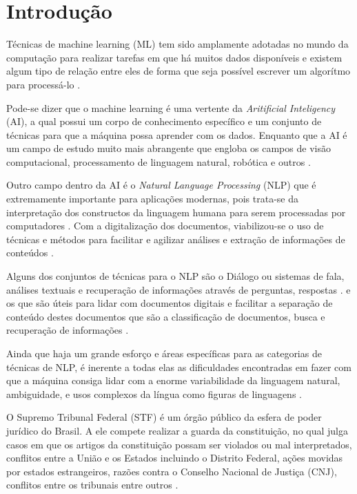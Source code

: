\chapter[Introdução]{Introdução}

Técnicas de machine learning (ML) tem sido amplamente adotadas no mundo da computação para realizar tarefas em que há muitos dados disponíveis e existem algum tipo de relação entre eles de forma que seja possível escrever um algorítmo para processá-lo \cite{BRINK2015}.

Pode-se dizer que o machine learning é uma vertente da \textit{Aritificial Inteligency} (AI), a qual possui um corpo de conhecimento específico e um conjunto de técnicas para que a máquina possa aprender com os dados. Enquanto que a AI é um campo de estudo muito mais abrangente que engloba os campos de visão computacional, processamento de linguagem natural, robótica e outros \cite{BRINK2015}. 

Outro campo dentro da AI é o \textit{Natural Language Processing} (NLP) que é extremamente importante para aplicações modernas, pois trata-se da interpretação dos constructos da linguagem humana para serem processadas por computadores \cite{GOLDBERG2017}.
Com a digitalização dos documentos, viabilizou-se o uso de técnicas e métodos para facilitar e agilizar análises e extração de informações de conteúdos \cite{OLIVEIRA2017}.


Alguns dos conjuntos de técnicas para o NLP são o Diálogo ou sistemas de fala, análises textuais e recuperação de informações através de perguntas, respostas \cite{ESLICKandLIU2005}.
e os que são úteis para lidar com documentos digitais e facilitar a separação de conteúdo destes documentos que são a classificação de documentos,  busca e recuperação de informações \cite{OLIVEIRA2017}.

Ainda que haja um grande esforço e áreas específicas para as categorias de técnicas de NLP, é inerente a todas elas as dificuldades encontradas em fazer com que a máquina consiga lidar com a enorme variabilidade da linguagem natural, ambiguidade, e usos complexos da língua como figuras de linguagens \cite{GOLDBERG2017}. 

O Supremo Tribunal Federal (STF) é um órgão público da esfera de poder jurídico do Brasil. A ele compete realizar a guarda da constituição, no qual julga casos em que os artigos da constituição possam ser violados ou mal interpretados, conflitos entre a União e os Estados incluindo o Distrito Federal, ações movidas por estados estrangeiros, razões contra o Conselho Nacional de Justiça (CNJ), conflitos entre os tribunais entre outros \cite{BRASIL1988}.

